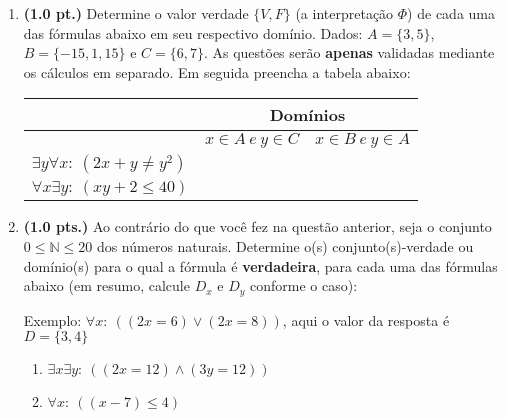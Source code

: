 \documentclass[a4paper,11pt]{article}
\begin{document}
\begin{enumerate}
\setlength{\itemsep}{13pt}


\item {\bf (1.0 pt.)} Determine o valor verdade $\{V, F \}$ (a interpretação $\Phi $)
de cada uma das fórmulas abaixo em seu respectivo domínio. Dados: $A = \{ 3,  5 \}$, $B = \{ -15, 1, 15\}$ e  $C = \{ 6,  7 \}$.
As questões serão \textbf{apenas} validadas mediante os cálculos em separado.
 Em seguida preencha a tabela abaixo:

\begin{center}
\begin{tabular}{l|c|c} \hline \hline
 & \multicolumn{2}{c}{Domínios} \\ \hline \hline
 & $x \in A ~e~ y \in C$ & $x \in B ~e~ y \in A$  \\ \hline

$\exists y \forall x: ~ (2x+y \neq y^2)$ &  &  \\ \hline
$\forall x \exists y: ~ (xy + 2 \leq 40)$ &   & \\ \hline \hline
\end{tabular}
\end{center}


\item {\bf (1.0 pts.)} Ao contrário  do que você fez na questão anterior, seja o conjunto $0 \leq \mathbb{N}\leq 20$ dos números naturais. Determine o(s) conjunto(s)-verdade ou domínio(s) para o qual a fórmula é \textbf{verdadeira}, para cada  uma das fórmulas abaixo (em resumo, calcule $D_x$ e $D_y$ conforme o caso):

Exemplo: $\forall x: ~ ((2x = 6) \vee (2x = 8)) $,  aqui o valor da resposta é $D=\{3, 4\}$

\begin{enumerate}
\itemsep -2pt   
  \item $\exists x \exists y: ~ ((2x = 12) \wedge (3y = 12)) $
      \item $\forall x: ~ ((x - 7) \le 4 )$
       

\end{enumerate}
\end{enumerate}
\end{document}
